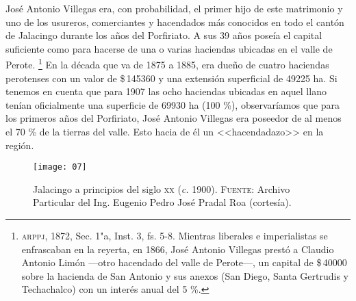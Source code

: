 \documentclass[14pt,twoside,final]{extbook} %
\let\oldfootnote\footnote
\renewcommand\footnote[1]{%
\oldfootnote{\hspace{1mm}#1}}
\begin{document}
José Antonio Villegas era, con probabilidad, el primer hijo de este matrimonio y uno de los usureros, comerciantes y hacendados más conocidos en todo el cantón de Jalacingo durante los años del Porfiriato. A sus 39 años poseía el capital suficiente como para hacerse de una o varias haciendas ubicadas en el valle de Perote.\footnote{\textsc{arppj}, 1872, Sec. 1"a, Inst. 3, fs. 5-8. Mientras liberales e imperialistas se enfrascaban en la reyerta, en 1866, José Antonio Villegas prestó a Claudio Antonio Limón ---otro hacendado del valle de Perote---, un capital de \$\,40000 sobre la hacienda de San Antonio y sus anexos (San Diego, Santa Gertrudis y Techachalco) con un interés anual del 5 \%.} En la década que va de 1875 a 1885, era dueño de cuatro haciendas perotenses con un valor de \$\,145360 y una extensión superficial de 49225 ha. Si tenemos en cuenta que para 1907 las ocho haciendas ubicadas en aquel llano tenían oficialmente una superficie de 69930 ha (100 \%), observaríamos que para los primeros años del Porfiriato, José Antonio Villegas era poseedor de al menos el 70 \% de la tierras del valle. Esto hacia de él un <<hacendadazo>> en la región.
\begin{sidewaysfigure}
\centering
\texttt{[image: 07]}
\caption[Jalacingo a principios del siglo \textsc{xx}]{Jalacingo a principios del siglo \textsc{xx} (\emph{c.} 1900). \textsc{Fuente:} Archivo Particular del Ing. Eugenio Pedro José Pradal Roa (cortesía).}
\label{fig:jalacingo-photo}
\end{sidewaysfigure}
\end{document}
